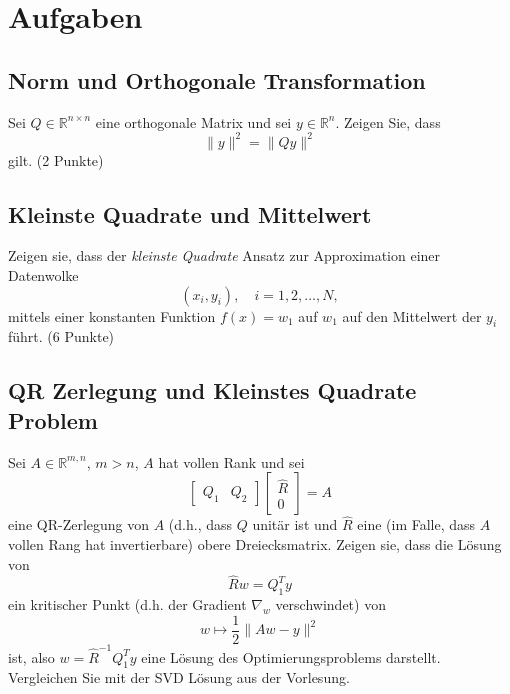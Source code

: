 \documentclass[
]{book}
\theoremstyle{definition}
\theoremstyle{definition}
\theoremstyle{definition}
\theoremstyle{definition}
\theoremstyle{remark}
\begin{document}
\hypertarget{aufgaben}{%
\section{Aufgaben}\label{aufgaben}}

\hypertarget{norm-und-orthogonale-transformation}{%
\subsection{Norm und Orthogonale Transformation}\label{norm-und-orthogonale-transformation}}

Sei \(Q\in \mathbb R^{n\times n}\) eine orthogonale Matrix und sei \(y\in \mathbb R^{n}\). Zeigen Sie, dass
\begin{equation*}
\|y\|^2 = \|Qy \|^2
\end{equation*}
gilt. (2 Punkte)

\hypertarget{kleinste-quadrate-und-mittelwert}{%
\subsection{Kleinste Quadrate und Mittelwert}\label{kleinste-quadrate-und-mittelwert}}

Zeigen sie, dass der \emph{kleinste Quadrate} Ansatz zur Approximation einer Datenwolke
\begin{equation*}
(x_i, y_i), \quad i=1,2,\dotsc,N,
\end{equation*}
mittels einer konstanten Funktion \(f(x)=w_1\) auf \(w_1\) auf den Mittelwert der \(y_i\) führt. (6 Punkte)

\hypertarget{qr-zerlegung-und-kleinstes-quadrate-problem}{%
\subsection{QR Zerlegung und Kleinstes Quadrate Problem}\label{qr-zerlegung-und-kleinstes-quadrate-problem}}

Sei \(A\in \mathbb R^{m,n}\), \(m>n\), \(A\) hat vollen Rank und sei
\begin{equation*}
\begin{bmatrix}
Q_1 & Q_2
\end{bmatrix}
\begin{bmatrix}
\hat R \\ 0
\end{bmatrix} = A
\end{equation*}
eine QR-Zerlegung von \(A\) (d.h., dass \(Q\) unitär ist und \(\hat R\) eine (im
Falle, dass \(A\) vollen Rang hat invertierbare) obere Dreiecksmatrix. Zeigen sie, dass die Lösung von
\begin{equation*}
\hat R w = Q_1^T y
\end{equation*}
ein kritischer Punkt (d.h. der Gradient \(\nabla_w\) verschwindet) von
\begin{equation*}
w \mapsto \frac 12 \| Aw - y \|^2
\end{equation*}
ist, also \(w=\hat R^{-1}Q_1^T y\) eine Lösung des Optimierungsproblems
darstellt. Vergleichen Sie mit der SVD Lösung aus der Vorlesung.
\end{document}
